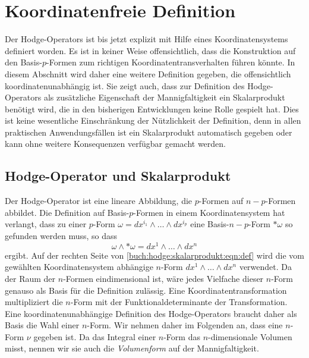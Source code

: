 %
%
%
\section{Koordinatenfreie Definition
\label{buch:hodge:section:koordinatenfrei}}
Der Hodge-Operators ist bis jetzt explizit mit Hilfe eines
Koordinatensystems definiert worden.
Es ist in keiner Weise offensichtlich, dass die Konstruktion auf
den Basis-$p$-Formen zum richtigen Koordinatentransverhalten führen
könnte.
In diesem Abschnitt wird daher eine weitere Definition gegeben,
die offensichtlich koordinatenunabhängig ist.
Sie zeigt auch, dass zur Definition des Hodge-Operators als
zusätzliche Eigenschaft der Mannigfaltigkeit ein Skalarprodukt
benötigt wird, die in den bisherigen Entwicklungen keine Rolle
gespielt hat.
Dies ist keine wesentliche Einschränkung der Nützlichkeit der
Definition, denn in allen praktischen Anwendungsfällen ist ein
Skalarprodukt automatisch gegeben oder kann ohne weitere Konsequenzen
verfügbar gemacht werden.

%
%
\subsection{Hodge-Operator und Skalarprodukt
\label{buch:hodge:koordinatenfrei:subsection:skalarprodukt}}
Der Hodge-Operator ist eine lineare Abbildung, die 
$p$-Formen auf $n-p$-Formen abbildet.
Die Definition auf Basis-$p$-Formen in einem Koordinatensystem
hat verlangt, dass zu einer $p$-Form $\omega=dx^{i_1}\wedge\dots\wedge dx^{i_p}$
eine Basis-$n-p$-Form $\ast\omega$ so gefunden werden muss, so dass
\begin{equation}
\omega\wedge {\ast\omega}
=
dx^1\wedge\dots\wedge dx^n
\label{buch:hodge:skalarprodukt:eqn:def}
\end{equation}
ergibt.
Auf der rechten Seite von \eqref{buch:hodge:skalarprodukt:eqn:def}
wird die vom gewählten Koordinatensystem abhängige $n$-Form
$dx^1\wedge\dots\wedge dx^n$ verwendet.
Da der Raum der $n$-Formen eindimensional ist, wäre jedes Vielfache
dieser $n$-Form genauso als Basis für die Definition zulässig.
Eine Koordinatentransformation multipliziert die $n$-Form mit der
Funktionaldeterminante der Transformation.
Eine koordinatenunabhängige Definition des Hodge-Operators braucht
daher als Basis die Wahl einer $n$-Form.
Wir nehmen daher im Folgenden an, dass eine $n$-Form $\nu$ gegeben
ist.
Da das Integral einer $n$-Form das $n$-dimensionale Volumen misst,
nennen wir sie auch die {\em Volumenform} auf der Mannigfaltigkeit.


